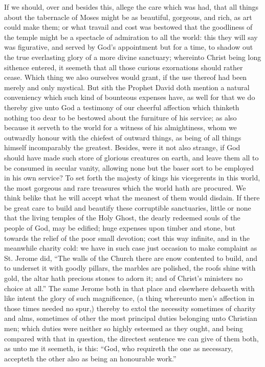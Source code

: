 If we should, over and besides this, allege the care which was had, that all things about the tabernacle of Moses might be as beautiful, gorgeous, and rich, as art could make them; or what travail and cost was bestowed that the goodliness of the temple might be a spectacle of admiration to all the world: this they will say was figurative, and served by God’s appointment but for a time, to shadow out the true everlasting glory of a more divine sanctuary; whereinto Christ being long sithence entered, it seemeth that all those curious exornations should rather cease. Which thing we also ourselves would grant, if the use thereof had been merely and only mystical. But sith the Prophet David doth mention a natural conveniency which such kind of bounteous expenses have, as well for that we do thereby give unto God a testimony of our cheerful affection which thinketh nothing too dear to be bestowed about the furniture of his service; as also because it serveth to the world for a witness of his almightiness, whom we outwardly honour with the chiefest of outward things, as being of all things himself incomparably the greatest. Besides, were it not also strange, if God should have made such store of glorious creatures on earth, and leave them all to be consumed in secular vanity, allowing none but the baser sort to be employed in his own service? To set forth the  majesty of kings his vicegerents in this world, the most gorgeous and rare treasures which the world hath are procured. We think belike that he will accept what the meanest of them would disdain.
If there be great care to build and beautify these corruptible sanctuaries, little or none that the living temples of the Holy Ghost, the dearly redeemed souls of the people of God, may be edified; huge expenses upon timber and stone, but towards the relief of the poor small devotion; cost this way infinite, and in the meanwhile charity cold: we have in such case just occasion to make complaint as St. Jerome did, “The walls of the Church there are enow contented to build, and to underset it with goodly pillars, the marbles are polished, the roofs shine with gold, the altar hath precious stones to adorn it; and of Christ’s ministers no choice at all.” The same Jerome both in that place and elsewhere debaseth with like intent the glory of such magnificence, (a thing whereunto men’s affection in those times needed no spur,) thereby to extol the necessity sometimes of charity and alms, sometimes of other the most principal duties belonging unto Christian men; which duties were neither so highly esteemed as they ought, and being compared with that in  question, the directest sentence we can give of them both, as unto me it seemeth, is this: “God, who requireth the one as necessary, accepteth the other also as being an honourable work.”


